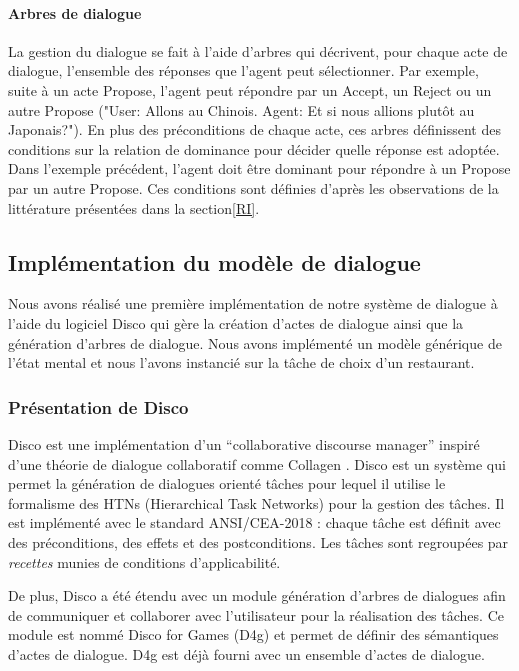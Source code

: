 \documentclass [french]{sig-alternate-05-2015}
\begin{document}
\paragraph{Arbres de dialogue}
La gestion du dialogue se fait à l'aide d'arbres qui décrivent, pour chaque acte de dialogue, l'ensemble des réponses que l'agent peut sélectionner. Par exemple, suite à un acte Propose, l'agent peut répondre par un Accept, un Reject ou un autre Propose ("User: Allons au Chinois. Agent: Et si nous allions plutôt au Japonais?"). En plus des préconditions de chaque acte, ces arbres définissent des conditions sur la relation de dominance pour décider quelle réponse est adoptée. Dans l'exemple précédent, l'agent doit être dominant pour répondre à un Propose par un autre Propose. Ces conditions sont définies d'après les observations de la littérature présentées dans la section\ref{RI}.


\subsection{Implémentation du modèle de dialogue}

\par Nous avons réalisé une première implémentation de notre système de dialogue à l'aide du logiciel Disco \cite{rich2009building} qui gère la création d'actes de dialogue ainsi que la génération d'arbres de dialogue. Nous avons implémenté un modèle générique de l'état mental et nous l'avons instancié sur la tâche de choix d'un restaurant.

\subsubsection{Présentation de Disco}
Disco est une implémentation d'un ``collaborative discourse manager'' inspiré d'une théorie de dialogue collaboratif comme Collagen \cite{rich1997collagen}. Disco est un système qui permet la génération de dialogues orienté tâches pour lequel il utilise le formalisme des HTNs (Hierarchical Task Networks) \cite{erol1994htn} pour la gestion des tâches. Il est implémenté avec le standard ANSI/CEA-2018 : chaque tâche est définit avec des préconditions, des effets et des postconditions. Les tâches sont regroupées par \emph{recettes} munies de conditions d'applicabilité.

De plus, Disco a été étendu avec un module génération d'arbres de dialogues afin de communiquer et collaborer avec l'utilisateur pour la réalisation des tâches. Ce module est nommé Disco for Games (D4g) et permet de définir des sémantiques d'actes de dialogue. D4g est déjà fourni avec un ensemble d'actes de dialogue.
\end{document}
